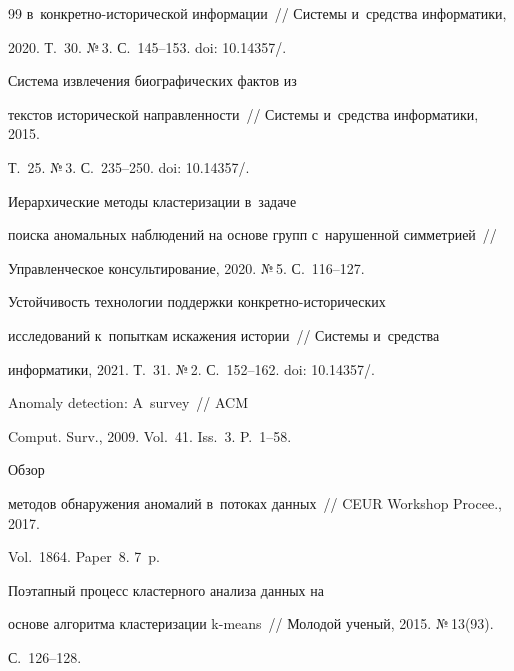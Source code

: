 {{\begin{thebibliography}{99}
в~кон\-крет\-но-ис\-то\-ри\-че\-ской информации~/\!\!/ Сис\-те\-мы и~средства информатики, 


2020. Т.~30. №\,3. С.~145--153. doi: 10.14357\!/.




   Система извлечения биографических фактов из 


текстов исторической направленности~/\!\!/ Сис\-те\-мы и~средства информатики, 2015. 


Т.~25. №\,3. С.~235--250. doi: 10.14357\!/.




   Иерархические методы кластеризации в~задаче 


поиска аномальных наблюдений на основе групп с~нарушенной симметрией~/\!\!/ 


Управленческое консультирование, 2020. №\,5. С.~116--127.




   Устойчивость технологии поддержки кон\-крет\-но-ис\-то\-ри\-че\-ских 


  исследований к~попыткам искажения истории~/\!\!/ Сис\-те\-мы и~средства 


информатики, 2021. Т.~31. №\,2. С.~152--162. doi: 10.14357\!/.




   Anomaly detection: A~survey~/\!\!/ ACM 


Comput. Surv., 2009. Vol.~41. Iss.~3. P.~1--58. 




   Обзор 


методов обнаружения аномалий в~потоках данных~/\!\!/ CEUR Workshop Procee., 2017. 


Vol.~1864. Paper~8. 7~p.




   Поэтапный процесс кластерного анализа данных на 


основе алгоритма кластеризации k-means~/\!\!/ Молодой ученый, 2015. №\,13(93).  


С.~126--128. 


          \end{thebibliography}


} }











